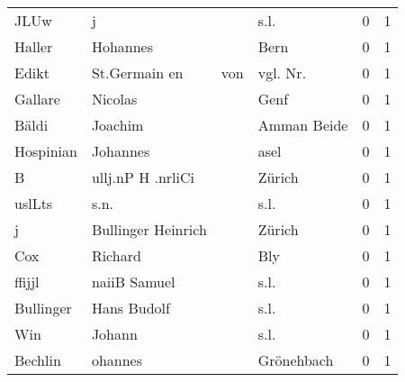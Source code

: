 \begin{tabular}{llllrr}
                     JLUw &                                  j &             &                                        s.l. &          0 &         1 \\
                   Haller &                           Hohannes &             &                                        Bern &          0 &         1 \\
                    Edikt &                      St.Germain en &         von &                                   vgl. Nr.  &          0 &         1 \\
                  Gallare &                            Nicolas &             &                                        Genf &          0 &         1 \\
                    Bäldi &                            Joachim &             &                                 Amman Beide &          0 &         1 \\
                Hospinian &                           Johannes &             &                                        asel &          0 &         1 \\
                        B &                  ullj.nP H .nrliCi &             &                                      Zürich &          0 &         1 \\
                   uslLts &                               s.n. &             &                                        s.l. &          0 &         1 \\
                        j &                 Bullinger Heinrich &             &                                      Zürich &          0 &         1 \\
                      Cox &                            Richard &             &                                         Bly &          0 &         1 \\
                   ffijjl &                       naiiB Samuel &             &                                        s.l. &          0 &         1 \\
                Bullinger &                        Hans Budolf &             &                                        s.l. &          0 &         1 \\
                      Win &                             Johann &             &                                        s.l. &          0 &         1 \\
                  Bechlin &                            ohannes &             &                                  Grönehbach &          0 &         1 \\

\end{tabular}
